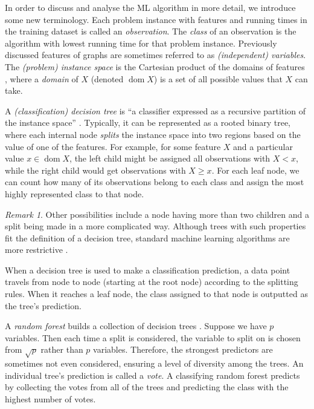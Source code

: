 \documentclass{l4proj}
\theoremstyle{definition}
\theoremstyle{remark}
\newtheorem{remark}{Remark}[chapter]
\DeclareMathOperator{\dom}{dom}
\begin{document}
In order to discuss and analyse the ML algorithm in more detail, we introduce
some new terminology. Each problem instance with features and running times in
the training dataset is called an \emph{observation}. The \emph{class} of an
observation is the algorithm with lowest running time for that problem instance.
Previously discussed features of graphs are sometimes referred to as
\emph{(independent) variables}. The \emph{(problem) instance space} is the
Cartesian product of the domains of features \cite{DBLP:series/smpai/RokachM14},
where a \emph{domain} of $X$ (denoted $\dom X$) is a set of all possible values
that $X$ can take.

A \emph{(classification) decision tree} is ``a classifier expressed as a
recursive partition of the instance space'' \cite{DBLP:series/smpai/RokachM14}.
Typically, it can be represented as a rooted binary tree, where each internal
node \emph{splits} the instance space into two regions based on the value of one
of the features. For example, for some feature $X$ and a particular value $x \in
\dom{X}$, the left child might be assigned all observations with $X < x$, while
the right child would get observations with $X \ge x$. For each leaf node, we
can count how many of its observations belong to each class and assign the most
highly represented class to that node.

\begin{remark}
  Other possibilities include a node having more than two children and a split
  being made in a more complicated way. Although trees with such properties fit
  the definition of a decision tree, standard machine learning algorithms are
  more restrictive \cite{James:2014:ISL:2517747, DBLP:series/smpai/RokachM14}.
\end{remark}

When a decision tree is used to make a classification prediction, a data point
travels from node to node (starting at the root node) according to the splitting
rules. When it reaches a leaf node, the class assigned to that node is outputted
as the tree's prediction.

A \emph{random forest} builds a collection of decision trees
\cite{James:2014:ISL:2517747}. Suppose we have $p$ variables. Then each time a
split is considered, the variable to split on is chosen from $\sqrt{p}$ rather
than $p$ variables. Therefore, the strongest predictors are sometimes not even
considered, ensuring a level of diversity among the trees. An individual tree's
prediction is called a \emph{vote}. A classifying random forest predicts by
collecting the votes from all of the trees and predicting the class with the
highest number of votes.
\end{document}
